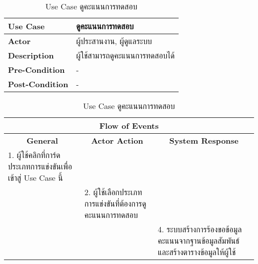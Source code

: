\begin{table}[H]
    \caption{Use Case ดูคะแนนการทดสอบ}
    \label{tab:usecase-read-result}
    \begin{tabularx}{\textwidth}{ | p{3cm} | X | }
    \hline
    \textbf{Use Case} & ดูคะแนนการทดสอบ \\
    \hline
    \textbf{Actor} & ผู้ประสานงาน, ผู้ดูแลระบบ \\
    \hline
    \textbf{Description} & ผู้ใช้สามารถดูคะแนนการทดสอบได้ \\
    \hline
    \textbf{Pre-Condition} & - \\
    \hline
    \textbf{Post-Condition} & - \\
    \hline
    \end{tabularx}
    \begin{tabularx}{\textwidth}{ | X | X | X | }
    \multicolumn{3}{|c|}{\textbf{Flow of Events}} \\
    \hline
    \multicolumn{1}{|c|}{\textbf{General}} & \multicolumn{1}{|c|}{\textbf{Actor Action}} & \multicolumn{1}{|c|}{\textbf{System Response}} \\
    \hline
    1. ผู้ใช้คลิกที่การ์ดประเภทการแข่งขันเพื่อเข้าสู่ Use Case นี้ &  &  \\
    \hline
    & 2. ผู้ใช้เลือกประเภทการแข่งขันที่ต้องการดูคะแนนการทดสอบ & \\
    \hline
    & & 4. ระบบสร้างการร้องขอข้อมูลคะแนนจากฐานข้อมูลสัมพันธ์และสร้างตารางข้อมูลให้ผู้ใช้ \\
    \hline
    \end{tabularx}
\end{table}
